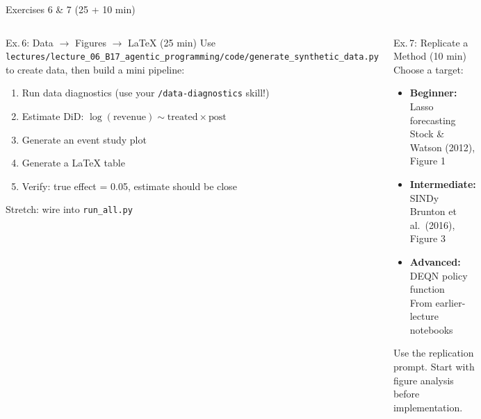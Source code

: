 \documentclass[aspectratio=169,10pt]{beamer}
\begin{document}
\begin{frame}[fragile]{Exercises 6 \& 7 {\small(25 + 10 min)}}
\begin{columns}[T]
\begin{exampleblock}{Ex.\,6: Data $\to$ Figures $\to$ LaTeX (25 min)}
\small
Use \texttt{lectures/lecture\_06\_B17\_agentic\_programming/code/generate\_synthetic\_data.py} to create data, then build a mini pipeline:
\begin{enumerate}\itemsep0pt
    \item Run data diagnostics (use your \texttt{/data-diagnostics} skill!)
    \item Estimate DiD: $\log(\text{revenue}) \sim \text{treated} \times \text{post}$
    \item Generate an event study plot
    \item Generate a LaTeX table
    \item Verify: true effect = 0.05, estimate should be close
\end{enumerate}

{\scriptsize Stretch: wire into \texttt{run\_all.py}}
\end{exampleblock}

\begin{exampleblock}{Ex.\,7: Replicate a Method (10 min)}
\small
Choose a target:
\begin{itemize}\itemsep0pt
    \item \textbf{Beginner:} Lasso forecasting\\[-2pt]
    {\scriptsize Stock \& Watson (2012), Figure 1}
    \item \textbf{Intermediate:} SINDy\\[-2pt]
    {\scriptsize Brunton et al.\ (2016), Figure 3}
    \item \textbf{Advanced:} DEQN policy function\\[-2pt]
    {\scriptsize From earlier-lecture notebooks}
\end{itemize}

\vspace{0.2em}
Use the replication prompt. Start with figure analysis before implementation.
\end{exampleblock}
\end{columns}
\end{frame}

\end{document}
